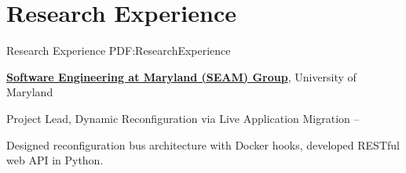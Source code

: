 
\section
{Research Experience}
{Research Experience}
{PDF:ResearchExperience}

\href{https://seam.cs.umd.edu/}
{\textbf{Software Engineering at Maryland (SEAM) Group}},
University of Maryland

\GapNoBreak
\hspace{1em} 
Project Lead, Dynamic Reconfiguration via Live Application Migration
\hfill
{} --
\begin{detail}
\SubBulletItem
Designed reconfiguration bus architecture with Docker hooks, developed RESTful web API in Python.
\end{detail}